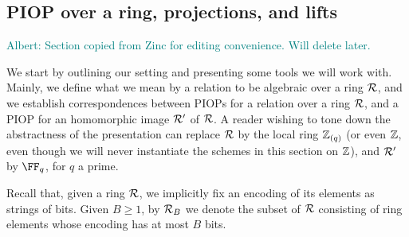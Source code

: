 \documentclass[11pt,letterpaper,usenames,dvipsnames]{article}
\newcommand{\albert}[1]{\textcolor{teal}{Albert: {#1}}}
\begin{document}
    \subsection{PIOP over a ring, projections, and lifts}
\albert{Section copied from Zinc for editing convenience. Will delete later.}

    We start by outlining our setting and presenting some tools we will work with. Mainly, we define what we mean by a relation to be algebraic over a ring $\mathcal{R}$, and we establish correspondences between PIOPs for a relation over a ring $\mathcal{R}$, and a PIOP for an homomorphic image $\mathcal{R}'$ of $\mathcal{R}$. A reader wishing to tone down the abstractness of the presentation can replace $\mathcal{R}$ by the local ring $\mathbb{Z}_{(q)}$ (or even $\mathbb{Z}$, even though we will never instantiate the schemes in this section on $\mathbb{Z}$), and $\mathcal{R}'$ by $\FF_q$, for $q$ a prime.

    
    Recall that, given a ring $\mathcal{R}$, we implicitly fix an encoding of its elements as strings of bits. Given $B\geq 1$, by $\mathcal{R}_B$ we denote the subset of $\mathcal{R}$ consisting of ring elements whose encoding has at most $B$ bits.
\end{document}
